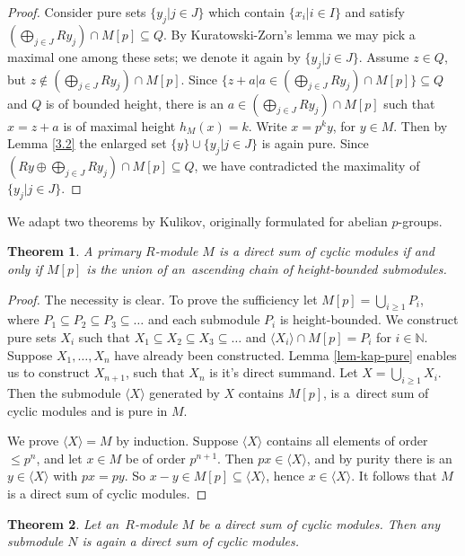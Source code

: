 \documentclass[twoside,leqno,12pt]{amsart}
\newtheorem{thm}{Theorem}[section]
\theoremstyle{definition}
\theoremstyle{remark}
\numberwithin{equation}{section}
\begin{document}
\begin{proof}
 Consider pure sets $\{y_j|j\in J\}$ which contain $\{x_i|i\in I\}$ and satisfy $(\bigoplus_{j\in J} Ry_j)\cap M[p] \subseteq Q$. By Kuratowski-Zorn's lemma we may pick a maximal one among these sets; we denote it again by $\{y_j|j\in J\}$. Assume $z\in Q$, but $z\notin ( \bigoplus_{j\in J} Ry_j)\cap M[p]$. Since $\{z+a|a\in ( \bigoplus_{j\in J} Ry_j)\cap M[p]\}\subseteq Q$ and $Q$ is of bounded height, there is an $a\in ( \bigoplus_{j\in J} Ry_j)\cap M[p]$ such that $x=z+a$ is of maximal height $h_M(x)=k$. Write $x=p^k y$, for $y\in M$. Then by Lemma \ref{3.2} the enlarged set $\{y\}\cup\{y_j|j\in J\}$ is again pure. Since $(Ry\oplus\bigoplus_{j\in J} Ry_j)\cap M[p]\subseteq Q$, we have contradicted the maximality of $\{y_j|j\in J\}$.
\end{proof}

We adapt two theorems by Kulikov, originally formulated for abelian $p$-groups.

\begin{thm}\label{kul1}
A primary $R$-module $M$ is a direct sum of cyclic modules if and only if $M[p]$ is the union of an~ascending chain of height-bounded submodules.
\end{thm}

\begin{proof}
 The necessity is clear. To prove the sufficiency let $M[p]=\bigcup_{i\geq 1}P_i$, where
 $P_1\subseteq P_2\subseteq P_3\subseteq\ldots$ and each submodule $P_i$ is height-bounded. We construct pure sets $X_i$ such that $X_1\subseteq X_2\subseteq X_3\subseteq\ldots$ and $\langle X_i\rangle\cap M[p]=P_i$ for $i\in\mathbb{N}$.  Suppose $X_1,\ldots,X_n$ have already been constructed. Lemma \ref{lem-kap-pure} enables us to construct $X_{n+1}$, such that $X_{n}$ is it's direct summand. Let $X=\bigcup_{i\geq 1}X_i$. Then the submodule $\langle X\rangle$ generated by $X$ contains $M[p]$, is a~direct sum of cyclic modules and is pure in $M$.

 We prove $\langle X\rangle=M$ by induction. Suppose $\langle X\rangle$ contains all elements of order $\leq p^n$, and let $x\in M$ be of order $p^{n+1}$. Then $px\in\langle X\rangle$, and by purity there is an $y\in\langle X\rangle$ with $px=py$. So $x-y\in M[p]\subseteq\langle X\rangle$, hence $x\in\langle X\rangle$. It follows that $M$ is a direct sum of cyclic modules.
\end{proof}

\begin{thm} \label{kul2}
 Let an~$R$-module $M$ be a direct sum of cyclic modules. Then any submodule $N$ is again a direct sum of cyclic modules.
\end{thm}
\end{document}
